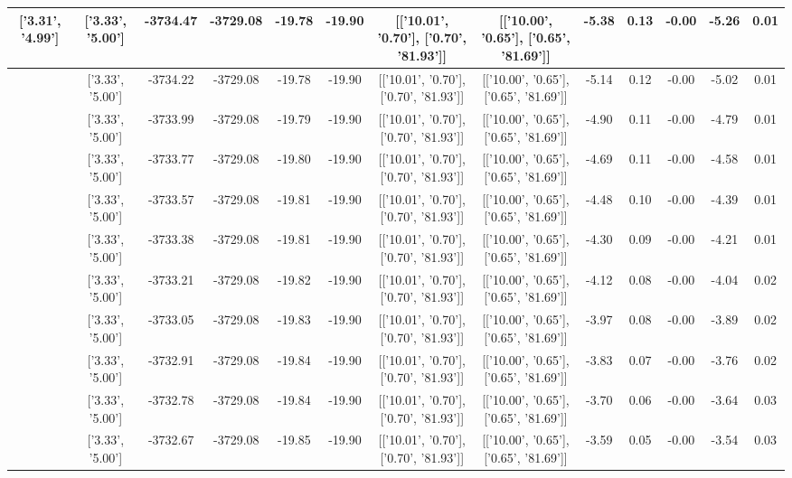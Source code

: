 \begin{table}[htbp]
\begin{adjustbox}{angle=90}
\begin{tabular}{|c|c|c|c|c|c|c|c|c|c|c|c|c|}
 ['3.31', '4.99'] & ['3.33', '5.00'] & -3734.47 & -3729.08 & -19.78 & -19.90 & [['10.01', '0.70'], ['0.70', '81.93']] & [['10.00', '0.65'], ['0.65', '81.69']] & -5.38 & 0.13 & -0.00 & -5.26 & 0.01\\ \hline
 ['3.31', '4.99'] & ['3.33', '5.00'] & -3734.22 & -3729.08 & -19.78 & -19.90 & [['10.01', '0.70'], ['0.70', '81.93']] & [['10.00', '0.65'], ['0.65', '81.69']] & -5.14 & 0.12 & -0.00 & -5.02 & 0.01\\ \hline
 ['3.31', '4.99'] & ['3.33', '5.00'] & -3733.99 & -3729.08 & -19.79 & -19.90 & [['10.01', '0.70'], ['0.70', '81.93']] & [['10.00', '0.65'], ['0.65', '81.69']] & -4.90 & 0.11 & -0.00 & -4.79 & 0.01\\ \hline
 ['3.31', '4.99'] & ['3.33', '5.00'] & -3733.77 & -3729.08 & -19.80 & -19.90 & [['10.01', '0.70'], ['0.70', '81.93']] & [['10.00', '0.65'], ['0.65', '81.69']] & -4.69 & 0.11 & -0.00 & -4.58 & 0.01\\ \hline
 ['3.32', '4.99'] & ['3.33', '5.00'] & -3733.57 & -3729.08 & -19.81 & -19.90 & [['10.01', '0.70'], ['0.70', '81.93']] & [['10.00', '0.65'], ['0.65', '81.69']] & -4.48 & 0.10 & -0.00 & -4.39 & 0.01\\ \hline
 ['3.32', '5.00'] & ['3.33', '5.00'] & -3733.38 & -3729.08 & -19.81 & -19.90 & [['10.01', '0.70'], ['0.70', '81.93']] & [['10.00', '0.65'], ['0.65', '81.69']] & -4.30 & 0.09 & -0.00 & -4.21 & 0.01\\ \hline
 ['3.32', '5.00'] & ['3.33', '5.00'] & -3733.21 & -3729.08 & -19.82 & -19.90 & [['10.01', '0.70'], ['0.70', '81.93']] & [['10.00', '0.65'], ['0.65', '81.69']] & -4.12 & 0.08 & -0.00 & -4.04 & 0.02\\ \hline
 ['3.32', '5.00'] & ['3.33', '5.00'] & -3733.05 & -3729.08 & -19.83 & -19.90 & [['10.01', '0.70'], ['0.70', '81.93']] & [['10.00', '0.65'], ['0.65', '81.69']] & -3.97 & 0.08 & -0.00 & -3.89 & 0.02\\ \hline
 ['3.32', '5.00'] & ['3.33', '5.00'] & -3732.91 & -3729.08 & -19.84 & -19.90 & [['10.01', '0.70'], ['0.70', '81.93']] & [['10.00', '0.65'], ['0.65', '81.69']] & -3.83 & 0.07 & -0.00 & -3.76 & 0.02\\ \hline
 ['3.32', '5.00'] & ['3.33', '5.00'] & -3732.78 & -3729.08 & -19.84 & -19.90 & [['10.01', '0.70'], ['0.70', '81.93']] & [['10.00', '0.65'], ['0.65', '81.69']] & -3.70 & 0.06 & -0.00 & -3.64 & 0.03\\ \hline
 ['3.32', '5.00'] & ['3.33', '5.00'] & -3732.67 & -3729.08 & -19.85 & -19.90 & [['10.01', '0.70'], ['0.70', '81.93']] & [['10.00', '0.65'], ['0.65', '81.69']] & -3.59 & 0.05 & -0.00 & -3.54 & 0.03\\ \hline

\end{tabular}
\end{adjustbox}
\end{table}
